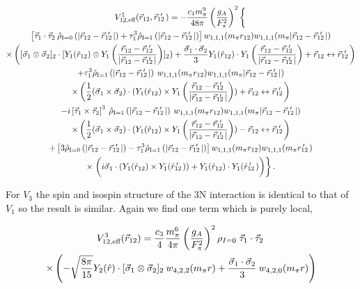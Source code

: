 \begin{multline}
V^{1}_{12,\text{eff}}(\rot,\rotp)=-\frac{c_1 m_\pi^9}{48\pi} \left(\frac{g_A}{F_\pi^2}\right)^2 
\left\{ \fracphantom \right. \\
\left[ \taudot \: \rhohat{0}{|\rot-\rotp|} + \tau_1^3 \rhohat{1}{|\rot-\rotp|} \right] \w{1}{1}{1}{ m_\pi r_{12}}\w{1}{1}{1}{ m_\pi | \rot-\rotp | } \\
\times \left( \sigmatwo \cdot [ Y_1 (\hat{r}_{12}) \otimes Y_1 \left(\frac{\rot-\rotp}{|\rot-\rotp|}\right) ]_2
 )  
 +\frac{\sigmadot}{3} Y_1 (\hat{r}_{12}) \cdot Y_1 \left(\frac{\rot-\rotp}{|\rot-\rotp|}\right)
+\rot\leftrightarrow\rotp\right) \\
%
+ \tau_1^3 \rhohat{1}{|\rot-\rotp|} \: \w{1}{1}{1}{m_\pi r_{12}} \w{1}{1}{1}{m_\pi | \rot-\rotp | } \\ 
\times \left(\fracphantom
\frac{1}{2}(\sigmacross)\cdot (Y_1 (\hat{r}_{12}) \times Y_1 \left(\frac{\rot-\rotp}{|\rot-\rotp|}\right) )+\rot\leftrightarrow\rotp\right) \\ 
%
- i \taucrossthree\: \rhohat{1}{|\rot-\rotp|} \: \w{1}{1}{1}{ m_\pi r_{12}}\w{1}{1}{1}{m_\pi | \rot-\rotp | }  \\
\times\left(\fracphantom
\frac{1}{2}(\sigmacross)\cdot (Y_1 (\hat{r}_{12}) \times Y_1 \left(\frac{\rot-\rotp}{|\rot-\rotp|}\right))-\rot\leftrightarrow\rotp\right) \\
%
+\left[3\rhohat{0}{|\rot-\rotp|}-\tau_1^3\rhohat{1}{|\rot-\rotp|}\right]\w{1}{1}{1}{ m_\pi r_{12}}\w{1}{1}{1}{m_\pi \rotpr} \\
\times\left.\left(i\vec{\sigma}_1 \cdot (Y_1 (\hat{r}_{12}) \times Y_1(\rotphat)) + Y_1 (\hat{r}_{12}) \cdot Y_1(\rotphat) \fracphantom \right)
\right\}.
\end{multline}

% 

For $V_3$ the spin and isospin structure of the 3N interaction is identical to that of $V_1$ so the result is similar. Again we find one term which is purely local,

\begin{multline}
V^{3}_{12,\text{eff}}(\vec{r}_{12})=\frac{c_3 }{4}\frac{m_\pi^6}{4\pi}\left(\frac{g_A}{F_\pi^2}\right)^2 \rho_{I=0}\;\vec{\tau}_1\cdot\vec{\tau}_2\:\\
 \times\left(-\sqrt{\frac{8\pi}{15}}Y_2(\hat{r})\cdot[\vec{\sigma}_1\otimes\vec{\sigma}_2]_2\: w_{4,2,2}(m_\pi r) + \frac{\vec{\sigma}_1\cdot\vec{\sigma}_2}{3}\:  w_{4,2,0}(m_\pi r) \right)
\end{multline}


